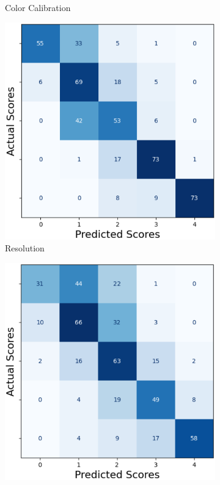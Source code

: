 \begin{figure}[ht]
\begin{subfigure}[b]{0.24\textwidth}
        \caption{Color Calibration}
        \label{fig:cm_cc}
    \end{subfigure}
    \hfill
    \begin{subfigure}[b]{0.24\textwidth}
        \includegraphics[width=\textwidth]{img/cm/res.png}
        \caption{Resolution}
        \label{fig:cm_res}
    \end{subfigure}
    \hfill
    \begin{subfigure}[b]{0.24\textwidth}
        \includegraphics[width=\textwidth]{img/cm/fov.png}

\end{subfigure}
\end{figure}
